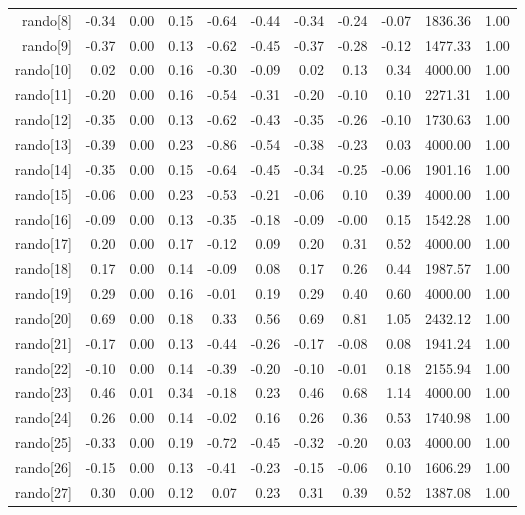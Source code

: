 \begin{table}[ht]
\begin{tabular}{rrrrrrrrrrr}
  rando[8] & -0.34 & 0.00 & 0.15 & -0.64 & -0.44 & -0.34 & -0.24 & -0.07 & 1836.36 & 1.00 \\ 
  rando[9] & -0.37 & 0.00 & 0.13 & -0.62 & -0.45 & -0.37 & -0.28 & -0.12 & 1477.33 & 1.00 \\ 
  rando[10] & 0.02 & 0.00 & 0.16 & -0.30 & -0.09 & 0.02 & 0.13 & 0.34 & 4000.00 & 1.00 \\ 
  rando[11] & -0.20 & 0.00 & 0.16 & -0.54 & -0.31 & -0.20 & -0.10 & 0.10 & 2271.31 & 1.00 \\ 
  rando[12] & -0.35 & 0.00 & 0.13 & -0.62 & -0.43 & -0.35 & -0.26 & -0.10 & 1730.63 & 1.00 \\ 
  rando[13] & -0.39 & 0.00 & 0.23 & -0.86 & -0.54 & -0.38 & -0.23 & 0.03 & 4000.00 & 1.00 \\ 
  rando[14] & -0.35 & 0.00 & 0.15 & -0.64 & -0.45 & -0.34 & -0.25 & -0.06 & 1901.16 & 1.00 \\ 
  rando[15] & -0.06 & 0.00 & 0.23 & -0.53 & -0.21 & -0.06 & 0.10 & 0.39 & 4000.00 & 1.00 \\ 
  rando[16] & -0.09 & 0.00 & 0.13 & -0.35 & -0.18 & -0.09 & -0.00 & 0.15 & 1542.28 & 1.00 \\ 
  rando[17] & 0.20 & 0.00 & 0.17 & -0.12 & 0.09 & 0.20 & 0.31 & 0.52 & 4000.00 & 1.00 \\ 
  rando[18] & 0.17 & 0.00 & 0.14 & -0.09 & 0.08 & 0.17 & 0.26 & 0.44 & 1987.57 & 1.00 \\ 
  rando[19] & 0.29 & 0.00 & 0.16 & -0.01 & 0.19 & 0.29 & 0.40 & 0.60 & 4000.00 & 1.00 \\ 
  rando[20] & 0.69 & 0.00 & 0.18 & 0.33 & 0.56 & 0.69 & 0.81 & 1.05 & 2432.12 & 1.00 \\ 
  rando[21] & -0.17 & 0.00 & 0.13 & -0.44 & -0.26 & -0.17 & -0.08 & 0.08 & 1941.24 & 1.00 \\ 
  rando[22] & -0.10 & 0.00 & 0.14 & -0.39 & -0.20 & -0.10 & -0.01 & 0.18 & 2155.94 & 1.00 \\ 
  rando[23] & 0.46 & 0.01 & 0.34 & -0.18 & 0.23 & 0.46 & 0.68 & 1.14 & 4000.00 & 1.00 \\ 
  rando[24] & 0.26 & 0.00 & 0.14 & -0.02 & 0.16 & 0.26 & 0.36 & 0.53 & 1740.98 & 1.00 \\ 
  rando[25] & -0.33 & 0.00 & 0.19 & -0.72 & -0.45 & -0.32 & -0.20 & 0.03 & 4000.00 & 1.00 \\ 
  rando[26] & -0.15 & 0.00 & 0.13 & -0.41 & -0.23 & -0.15 & -0.06 & 0.10 & 1606.29 & 1.00 \\ 
  rando[27] & 0.30 & 0.00 & 0.12 & 0.07 & 0.23 & 0.31 & 0.39 & 0.52 & 1387.08 & 1.00 \\ 

\end{tabular}
\end{table}
